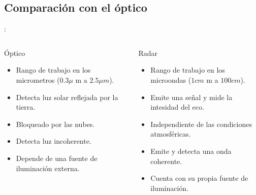 \subsection{Comparación con el óptico}
\begin{frame}{\secname : \subsecname}
\begin{columns}
  \begin{column}{0.5\textwidth}
   \begin{block}{Óptico}
     \begin{itemize}
       \item Rango de trabajo en los micrometros ($0.3\mu$ m a $2.5\mu m$).
       \item Detecta luz solar reflejada por la tierra.
       \item Bloqueado por las nubes.
       \item Detecta luz incoherente.
       \item Depende de una fuente de iluminación externa.
     \end{itemize}
   \end{block}
  \end{column}
  \begin{column}{0.5\textwidth}  %
    \begin{block}{Radar}
      \begin{itemize}
        \item Rango de trabajo en los microondas ($1cm$ m a $100cm$).
        \item Emite una señal y mide la intesidad del eco.
        \item Independiente de las condiciones atmosféricas.
        \item Emite y detecta una onda coherente.
        \item Cuenta con su propia fuente de iluminación.
      \end{itemize}
    \end{block}
  \end{column}
  \end{columns}
\end{frame}
